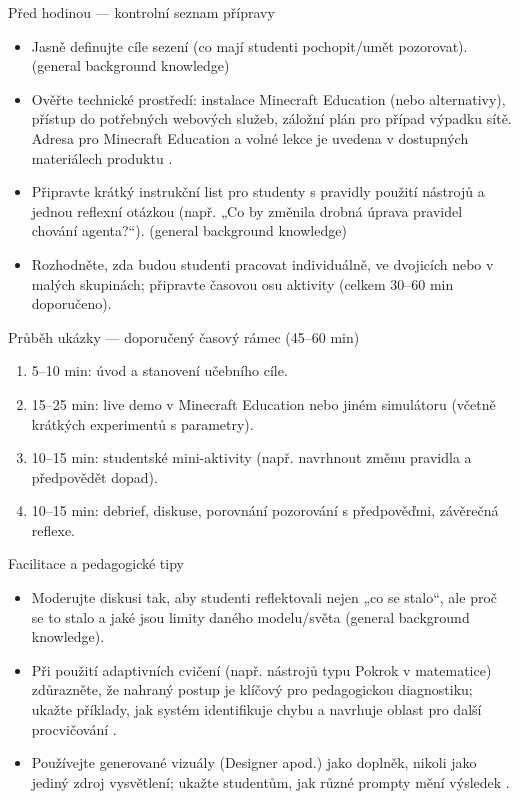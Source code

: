 Před hodinou — kontrolní seznam přípravy
\begin{itemize}
  \item Jasně definujte cíle sezení (co mají studenti pochopit/umět pozorovat). (general background knowledge)
  \item Ověřte technické prostředí: instalace Minecraft Education (nebo alternativy), přístup do potřebných webových služeb, záložní plán pro případ výpadku sítě. Adresa pro Minecraft Education a volné lekce je uvedena v dostupných materiálech produktu \cite{kb_ai_101_tipu_pdf_04e4a115_page_15_2}.
  \item Připravte krátký instrukční list pro studenty s pravidly použití nástrojů a jednou reflexní otázkou (např. „Co by změnila drobná úprava pravidel chování agenta?“). (general background knowledge)
  \item Rozhodněte, zda budou studenti pracovat individuálně, ve dvojicích nebo v malých skupinách; připravte časovou osu aktivity (celkem 30--60 min doporučeno).
\end{itemize}

Průběh ukázky — doporučený časový rámec (45--60 min)
\begin{enumerate}
  \item 5--10 min: úvod a stanovení učebního cíle.
  \item 15--25 min: live demo v Minecraft Education nebo jiném simulátoru (včetně krátkých experimentů s parametry).
  \item 10--15 min: studentské mini-aktivity (např. navrhnout změnu pravidla a předpovědět dopad).
  \item 10--15 min: debrief, diskuse, porovnání pozorování s předpověďmi, závěrečná reflexe.
\end{enumerate}

Facilitace a pedagogické tipy
\begin{itemize}
  \item Moderujte diskusi tak, aby studenti reflektovali nejen „co se stalo“, ale proč se to stalo a jaké jsou limity daného modelu/světa (general background knowledge).
  \item Při použití adaptivních cvičení (např. nástrojů typu Pokrok v matematice) zdůrazněte, že nahraný postup je klíčový pro pedagogickou diagnostiku; ukažte příklady, jak systém identifikuje chybu a navrhuje oblast pro další procvičování \cite{kb_ai_101_tipu_pdf_04e4a115_page_8_1}.
  \item Používejte generované vizuály (Designer apod.) jako doplněk, nikoli jako jediný zdroj vysvětlení; ukažte studentům, jak různé prompty mění výsledek \cite{kb_ai_101_tipu_pdf_04e4a115_page_51_1}.
\end{itemize}

